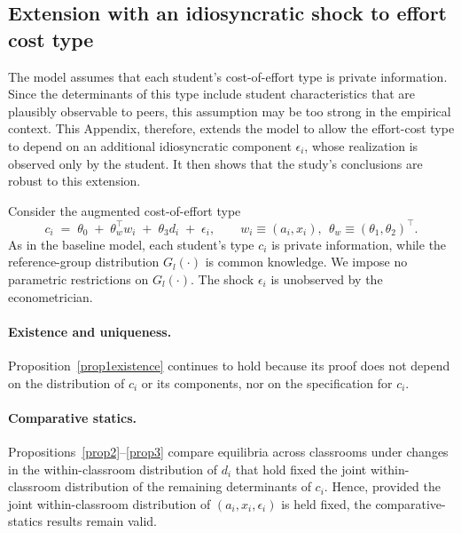 \subsection{Extension with an idiosyncratic shock to effort cost type}\label{sec:model_extension}




The model assumes that each student's cost-of-effort type is private information. Since the determinants of this type include student characteristics that are plausibly observable to peers, this assumption may be too strong in the empirical context. This Appendix, therefore, extends the model to allow the effort-cost type to depend on an additional idiosyncratic component $\epsilon_i$, whose realization is observed only by the student. It then shows that the study's conclusions are robust to this extension.\par 






Consider the augmented cost-of-effort type
\begin{equation}\label{eq:cost_effort_extension2}
c_i \;=\; \theta_0 \;+\; \theta_w^\top w_i \;+\; \theta_3 d_i \;+\; \epsilon_i,
\qquad
w_i \equiv (a_i,x_i), \ \ \theta_w \equiv (\theta_1,\theta_2)^\top.
\end{equation}
As in the baseline model, each student’s type $c_i$ is private information, while the reference-group distribution $G_l(\cdot)$ is common knowledge. We impose no parametric restrictions on $G_l(\cdot)$. The shock $\epsilon_i$ is unobserved by the econometrician.

\paragraph{Existence and uniqueness.}
Proposition~\ref{prop1existence} continues to hold because its proof does not depend on the distribution of $c_i$ or its components, nor on the specification for $c_i$. 

\paragraph{Comparative statics.}
Propositions~\ref{prop2}--\ref{prop3} compare equilibria across classrooms under changes in the within-classroom distribution of $d_i$ that hold fixed the joint within-classroom distribution of the remaining determinants of $c_i$. Hence, provided the joint within-classroom distribution of $(a_i,x_i,\epsilon_i)$ is held fixed, the comparative-statics results remain valid.
